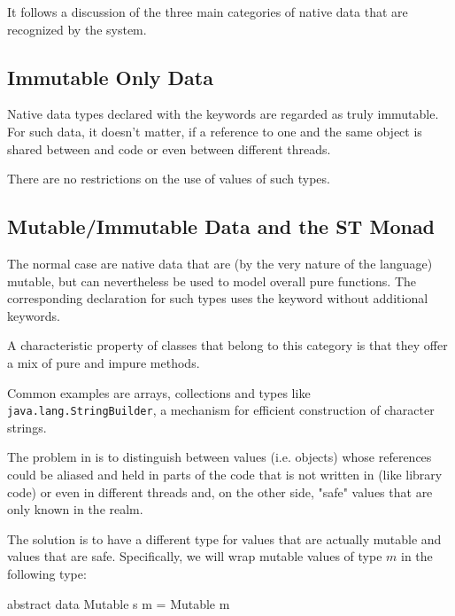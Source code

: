 It follows a discussion of the three main categories of native data that are recognized by the \frege{} system.

\subsection{Immutable Only Data}

Native data types declared with the  keywords are regarded as truly immutable. For such data, it doesn't matter, if a reference to one and the same object is shared between \java{} and \frege{} code or even between different threads.

There are no restrictions on the use of values of such types.


\subsection{Mutable/Immutable Data and the ST Monad}

The normal case are native data that are (by the very nature of the \java{} language) mutable, but can nevertheless be used to model overall pure functions. The corresponding  declaration for such types uses the keyword  without additional keywords.

A characteristic property of \java{} classes that belong to this category is that they offer a mix of pure and impure methods.

Common examples are arrays, collections and types like \texttt{java.lang.StringBuilder}, a mechanism for efficient construction of character strings.

The problem in \frege{} is to distinguish between values (i.e. \java{} objects) 
whose references could be aliased and held in parts of the code that is not written in \frege{} (like library code) 
or even in different threads and, on the other side, 
"safe" values that are only known in the \frege{} realm.

The solution is to have a different type for values that are actually mutable and values that are safe. Specifically, we will wrap mutable values of type $m$ in the following type:

\begin{code}
abstract data Mutable s m = Mutable m
\end{code}

